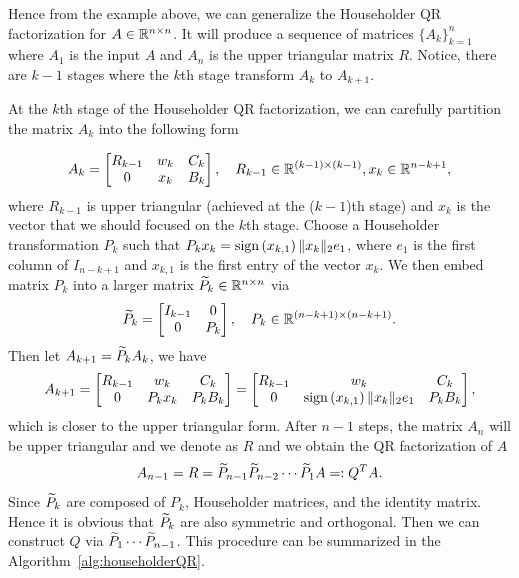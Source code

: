 Hence from the example above, we can generalize the Householder QR factorization for $A\in\mathbb{R}^{n\times n}$. It will produce a sequence of matrices $\{A_k\}_{k=1}^{n}$ where $A_1$ is the input $A$ and $A_n$ is the upper triangular matrix $R$. Notice, there are $k-1$ stages where the $k$th stage transform $A_k$ to $A_{k+1}$.

At the $k$th stage of the Householder QR factorization, we can carefully partition the matrix $A_k$ into the following form

\begin{equation}\notag
    A_{k} =
    \begin{bmatrix}
        R_{k-1} & w_k & C_k \\
        0 & x_k & B_k
    \end{bmatrix},
    \quad R_{k-1}\in\mathbb{R}^{(k-1)\times (k-1)}, x_k\in\mathbb{R}^{n-k+1},
\end{equation}
where $R_{k-1}$ is upper triangular (achieved at the ($k-1$)th stage) and $x_k$ is the vector that we should focused on the $k$th stage. Choose a Householder transformation $P_k$ such that $P_kx_k = \mathrm{sign}\left({x_{k,1}}\right)\|{x_k}\|_2e_1$, where $e_1$ is the first column of $I_{n-k+1}$ and $x_{k,1}$ is the first entry of the vector $x_k$. We then embed matrix $P_k$ into a larger matrix $\widetilde P_k\in\mathbb{R}^{n\times n}$ via
\begin{equation}\label{eq.qrQ}
    \widetilde P_k =
    \begin{bmatrix}
        I_{k-1} & 0 \\
        0 & P_k
    \end{bmatrix},\quad P_k \in \mathbb{R}^{(n-k+1)\times(n-k+1)}.
\end{equation}
Then let $A_{k+1} = \widetilde P_k A_k$, we have 
\begin{equation}\label{eq.qrstep}
    A_{k+1} = 
    \begin{bmatrix}
        R_{k-1} & w_k & C_k \\
        0 & P_k x_k & P_k B_k
    \end{bmatrix}
     = 
     \begin{bmatrix}
        R_{k-1} & w_k & C_k \\
        0 & \mathrm{sign}\left({x_{k,1}}\right)\|{x_k}\|_2e_1 & P_k B_k
     \end{bmatrix},
\end{equation}
which is closer to the upper triangular form. After $n-1$ steps, the matrix $A_{n}$ will be upper triangular and we denote as $R$ and we obtain the QR factorization of $A$
\begin{equation}\notag
    A_{n-1} = R = \widetilde P_{n-1}\widetilde P_{n-2} \cdots \widetilde P_1 A =: Q^T A.
\end{equation}
Since $\widetilde P_k$ are composed of $P_k$, Householder matrices, and the identity matrix. Hence it is obvious that $\widetilde P_k$ are also symmetric and orthogonal. Then we can construct $Q$ via $\widetilde P_1 \cdots\widetilde P_{n-1}$. This procedure can be summarized in the Algorithm~\ref{alg:householderQR}.

